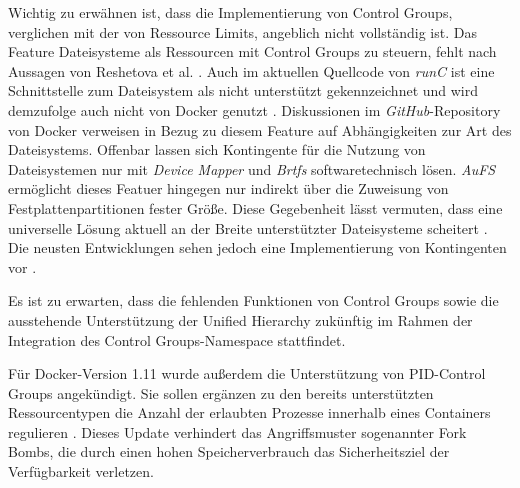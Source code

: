 \documentclass[../main.tex]{subfiles}
\begin{document}
{		Wichtig zu erwähnen ist, dass die Implementierung von Control Groups, verglichen mit der von Ressource Limits, angeblich nicht vollständig ist. Das Feature Dateisysteme als Ressourcen mit Control Groups zu steuern, fehlt nach Aussagen von Reshetova et al. \cite[S.19]{dockerSec2}. Auch im aktuellen Quellcode von \emph{runC} ist eine Schnittstelle zum Dateisystem als \glqq{}nicht unterstützt\grqq{} gekennzeichnet und wird demzufolge auch nicht von Docker genutzt \cite{githubRunCCgroups}. Diskussionen im \emph{GitHub}-Repository von Docker verweisen in Bezug zu diesem Feature auf Abhängigkeiten zur Art des Dateisystems. Offenbar lassen sich Kontingente für die Nutzung von Dateisystemen nur mit \emph{Device Mapper} und \emph{Brtfs} softwaretechnisch lösen. \emph{AuFS} ermöglicht dieses Featuer hingegen nur indirekt über die Zuweisung von Festplattenpartitionen fester Größe. Diese Gegebenheit lässt vermuten, dass eine universelle Lösung aktuell an der Breite unterstützter Dateisysteme scheitert \cite{githubDockerIssueFsQuota}. Die neusten Entwicklungen sehen jedoch eine Implementierung von Kontingenten vor \cite{githubDockerPullBrtfs}.

		Es ist zu erwarten, dass die fehlenden Funktionen von Control Groups sowie die ausstehende Unterstützung der Unified Hierarchy zukünftig im Rahmen der Integration des Control Groups-Namespace stattfindet.

		Für Docker-Version 1.11 wurde außerdem die Unterstützung von PID-Control Groups angekündigt. Sie sollen ergänzen zu den bereits unterstützten Ressourcentypen die Anzahl der erlaubten Prozesse innerhalb eines Containers regulieren \cite{githubCgroupPID}\cite{docker110Security}. Dieses Update verhindert das Angriffsmuster sogenannter Fork Bombs, die durch einen hohen Speicherverbrauch das Sicherheitsziel der Verfügbarkeit verletzen.



}
\end{document}
